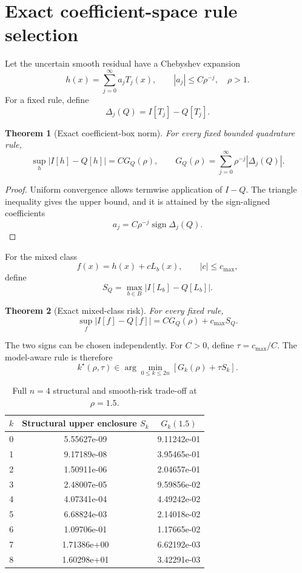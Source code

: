 \documentclass[preprint,12pt]{elsarticle}
\newtheorem{theorem}{Theorem}
\theoremstyle{remark}
\begin{document}
\FloatBarrier

\section{Exact coefficient-space rule selection}

Let the uncertain smooth residual have a Chebyshev expansion
\[
h(x)=\sum_{j=0}^{\infty}a_jT_j(x),
\qquad
|a_j|\leq C\rho^{-j},
\quad \rho>1.
\]
For a fixed rule, define
\[
\Delta_j(Q)=I[T_j]-Q[T_j].
\]

\begin{theorem}[Exact coefficient-box norm]
For every fixed bounded quadrature rule,
\[
\sup_h |I[h]-Q[h]|
=
C G_Q(\rho),
\qquad
G_Q(\rho)
=
\sum_{j=0}^{\infty}\rho^{-j}|\Delta_j(Q)|.
\]
\end{theorem}

\begin{proof}
Uniform convergence allows termwise application of \(I-Q\). The
triangle inequality gives the upper bound, and it is attained by the
sign-aligned coefficients
\[
a_j=C\rho^{-j}\operatorname{sign}\Delta_j(Q).
\]
\end{proof}

For the mixed class
\[
f(x)=h(x)+cL_b(x),
\qquad
|c|\leq c_{\max},
\]
define
\[
S_Q=\max_{b\in B}|I[L_b]-Q[L_b]|.
\]

\begin{theorem}[Exact mixed-class risk]
For every fixed rule,
\[
\sup_f |I[f]-Q[f]|
=
C G_Q(\rho)+c_{\max}S_Q.
\]
\end{theorem}

The two signs can be chosen independently. For \(C>0\), define
\(\tau=c_{\max}/C\). The model-aware rule is therefore
\[
k^\star(\rho,\tau)
\in
\arg\min_{0\leq k\leq2n}
\left[G_k(\rho)+\tau S_k\right].
\]

\begin{table}[ht]
\centering
\caption{Full \(n=4\) structural and smooth-risk trade-off at
\(\rho=1.5\).}
\label{tab:risk-components}
\small
\begin{tabular}{ccc}
\toprule
\(k\) & Structural upper enclosure \(S_k\) & \(G_k(1.5)\)\\
\midrule
0 & 5.55627e-09 & 9.11242e-01 \\
1 & 9.17189e-08 & 3.95465e-01 \\
2 & 1.50911e-06 & 2.04657e-01 \\
3 & 2.48007e-05 & 9.59856e-02 \\
4 & 4.07341e-04 & 4.49242e-02 \\
5 & 6.68824e-03 & 2.14018e-02 \\
6 & 1.09706e-01 & 1.17665e-02 \\
7 & 1.71386e+00 & 6.62192e-03 \\
8 & 1.60298e+01 & 3.42291e-03 \\
\bottomrule
\end{tabular}
\end{table}
\end{document}
